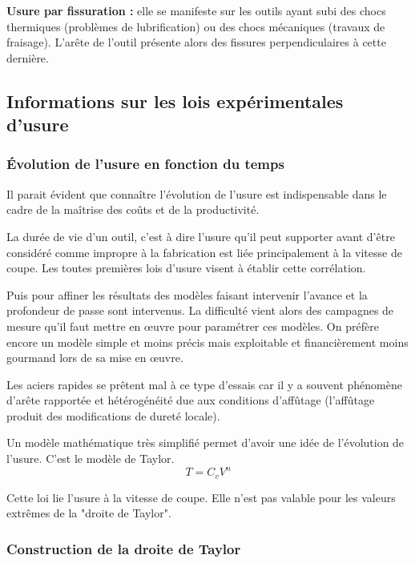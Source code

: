 \documentclass[11pt,oneside]{article}
\begin{document}
\textbf{Usure par fissuration :} elle se manifeste sur les outils ayant subi des chocs thermiques (problèmes de lubrification) ou des chocs mécaniques (travaux de fraisage). L'arête de l'outil présente alors des fissures perpendiculaires à cette dernière.

\subsection{Informations sur les lois expérimentales d'usure}

\subsubsection{Évolution de l'usure en fonction du temps}
Il parait évident que connaître l'évolution de l'usure est indispensable dans le cadre de la maîtrise des coûts et de la productivité. 

La durée de vie d'un outil, c'est à dire l'usure qu'il peut supporter avant d'être considéré comme impropre à la fabrication est liée principalement à la vitesse de coupe. Les toutes premières lois d'usure visent à établir cette corrélation. 

Puis pour affiner les résultats des modèles faisant intervenir l'avance et la profondeur de passe sont intervenus. La difficulté vient alors des campagnes de mesure qu'il faut mettre en œuvre pour paramétrer ces modèles. On préfère encore un modèle simple et moins précis mais exploitable et financièrement moins gourmand lors de sa mise en œuvre.
	
Les aciers rapides se prêtent mal à ce type d'essais car il y a souvent phénomène d'arête rapportée et hétérogénéité due aux conditions d'affûtage (l'affûtage produit des modifications de dureté locale).

Un modèle mathématique très simplifié permet d’avoir une idée de l’évolution de l’usure. C’est le modèle de Taylor.
$$
T = C_v V^n
$$

Cette loi lie l'usure à la vitesse de coupe. Elle n'est pas valable pour les valeurs extrêmes de la "droite de Taylor".


\subsubsection{Construction de la droite de Taylor}
\end{document}
